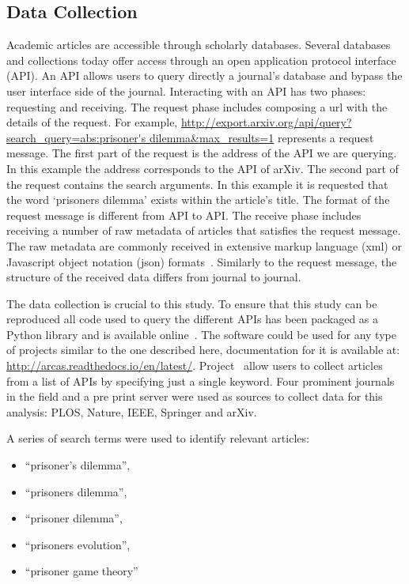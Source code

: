 \documentclass{article}
\theoremstyle{definition}
\begin{document}
\subsection{Data Collection}\label{section:data_collection}

Academic articles are accessible through scholarly databases.
Several databases and collections today offer access through
an open application protocol interface (API). An API allows users to query
directly a journal's database and bypass the user interface side of the journal.
Interacting with an API has two phases: requesting and receiving.
The request phase includes composing a url with the details of the request. For
example, \url{http://export.arxiv.org/api/query?search_query=abs:prisoner's dilemma&max_results=1}
represents a request message. The first part of the request is the address
of the API we are querying.
In this example the address corresponds to the API of arXiv.
The second part of the request contains the search arguments. In this example 
it is requested that the word `prisoners dilemma' exists within the article's title.
The format of the request message is different from API to API.
The receive phase includes receiving a number of raw metadata of articles that
satisfies the request message. The raw metadata are commonly received in extensive markup
language (xml) or Javascript object notation (json) formats~\cite{nurseitov2009}.
Similarly to the request message, the structure of the received data differs from journal
to journal.

The data collection is crucial to this study. To ensure that this study can be
reproduced all code used to query the different APIs has been packaged as a Python library and is
available online~\cite{nikoleta_2017}. The software could be used for any type of
projects similar to the one described here, documentation for it is available at:
\url{http://arcas.readthedocs.io/en/latest/}.
Project~\cite{nikoleta_2017} allow users to collect articles from a list of APIs by
specifying just a single keyword. Four prominent journals in the field and a
pre print server were used as sources to collect data for this analysis:
PLOS, Nature, IEEE, Springer and arXiv.

A series of search terms were used to identify relevant articles:

\begin{itemize}
    \item ``prisoner's dilemma'',
    \item ``prisoners dilemma'',
    \item ``prisoner dilemma'',
    \item ``prisoners evolution'',
    \item ``prisoner game theory''
\end{itemize}
\end{document}
